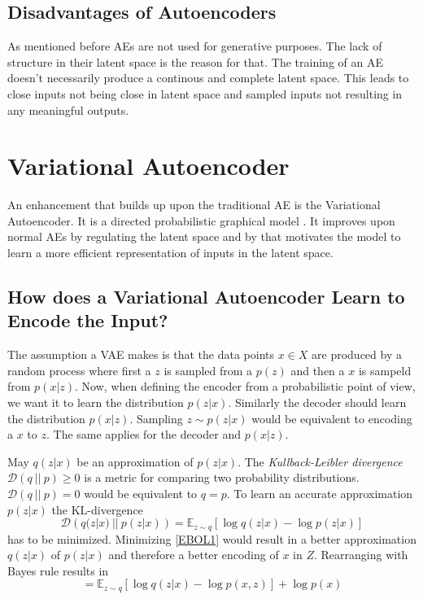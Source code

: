 \documentclass[a4paper]{IEEEtran}
\begin{document}
\subsection{Disadvantages of Autoencoders}
As mentioned before AEs are not used for generative purposes. The lack of structure in their latent space is the reason for that. The training of an AE doesn't necessarily produce a continous and complete latent space. This leads to close inputs not being close in latent space and sampled inputs not resulting in any meaningful outputs.

\section{Variational Autoencoder}
An enhancement that builds up upon the traditional AE is the Variational Autoencoder. It is a directed probabilistic graphical model \cite{kingma2014autoencoding}. It improves upon normal AEs by regulating the latent space and by that motivates the model to learn a more efficient representation of inputs in the latent space.
\subsection{How does a Variational Autoencoder Learn to Encode the Input?}
The assumption a VAE makes is that the data points $x \in X$ are produced by a random process where first a $z$ is sampled from a $p(z)$ and then a $x$ is sampeld from $p(x|z)$. Now, when defining the encoder from a probabilistic point of view, we want it to learn the distribution $p(z|x)$. Similarly the decoder should learn the distribution $p(x|z)$. Sampling $z \sim p(z|x)$ would be equivalent to encoding a $x$ to $z$. The same applies for the decoder and $p(x|z)$.

May $q(z|x)$ be an approximation of $p(z|x)$. The 
\textit{Kullback-Leibler divergence} $\mathcal{D}(q \ || \ p) \geq 0$ is a metric for comparing two probability distributions. $\mathcal{D}(q \ || \ p) = 0$ would be equivalent to $q = p$. To learn an accurate approximation $p(z|x)$ the KL-divergence
\begin{equation}
	\mathcal{D}\left(q(z|x) \ || \ p(z|x) \right) = \mathbb{E}_{z \sim q}\left[ \log q(z|x) - \log p(z|x) \right]
	\label{EBOL1}
\end{equation}
has to be minimized. Minimizing \eqref{EBOL1} would result in a better approximation $q(z|x)$ of $p(z|x)$ and therefore a better encoding of $x$ in $Z$. Rearranging with Bayes rule results in
\begin{equation}
	= \mathbb{E}_{z \sim q} \left[ \log q(z|x) - \log p(x,z) \right] + \log p(x)
	\label{EBOL2}
\end{equation}
\end{document}
